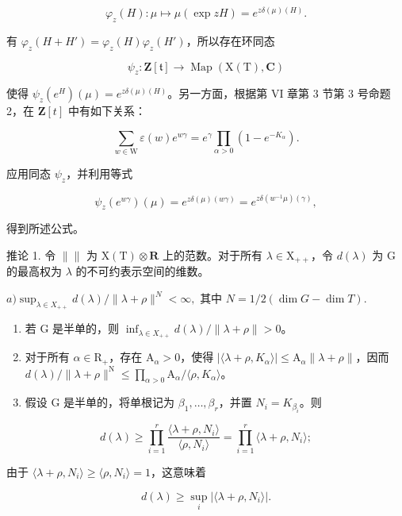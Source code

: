\[
\varphi_ {z} (H): \mu \mapsto \mu (\exp z H) = e ^ {z \delta (\mu) (H)}.
\]

有 \(\varphi_z(H + H') = \varphi_z(H)\varphi_z(H')\)，所以存在环同态

\[
\psi_ {z}: \mathbf {Z} [ \mathfrak {t} ] \to \operatorname{Map} (\mathrm{X} (\mathrm{T}), \mathbf {C})
\]

使得 \(\psi_z(e^H)(\mu) = e^{z\delta (\mu)(H)}\)。另一方面，根据第 VI 章第 3 节第 3 号命题 2，在 \(\mathbf{Z}[t]\) 中有如下关系：

\[
\sum_ {w \in \mathrm{W}} \varepsilon (w) e ^ {w \gamma} = e ^ {\gamma} \prod_ {\alpha > 0} (1 - e ^ {- K _ {\alpha}}).
\]

应用同态 \(\psi_z\)，并利用等式

\[
\psi_ {z} (e ^ {w \gamma}) (\mu) = e ^ {z \delta (\mu) (w \gamma)} = e ^ {z \delta (w ^ {- 1} \mu) (\gamma)},
\]

得到所述公式。

推论 1. 令 \(\| \|\) 为 \(\mathrm{X(T)}\otimes \mathbf{R}\) 上的范数。对于所有 \(\lambda \in \mathrm{X}_{++}\)，令 \(d(\lambda)\) 为 \(\mathrm{G}\) 的最高权为 \(\lambda\) 的不可约表示空间的维数。

\(a) \sup_{\lambda \in X_{++}} d(\lambda) / \| \lambda + \rho \|^{N} < \infty, \text{ 其中 } N = 1/2 (\dim G - \dim T).\)

\begin{enumerate}
\def\labelenumi{\alph{enumi})}
\setcounter{enumi}{1}
\item
  若 G 是半单的，则 \(\inf_{\lambda\in X_{++}}d(\lambda)/\|\lambda+\rho\|>0\)。
\item
  对于所有 \(\alpha \in \mathrm{R}_{+}\)，存在 \(\mathrm{A}_{\alpha} > 0\)，使得 \(|\langle \lambda + \rho, K_{\alpha} \rangle| \leq \mathrm{A}_{\alpha} \| \lambda + \rho \|\)，因而 \(d(\lambda) / \| \lambda + \rho \|^{\mathrm{N}} \leq \prod_{\alpha > 0} \mathrm{A}_{\alpha} / \langle \rho, K_{\alpha} \rangle\)。
\item
  假设 G 是半单的，将单根记为 \(\beta_{1},\ldots,\beta_{r}\)，并置 \(N_{i}=K_{\beta_{i}}\)。则
\end{enumerate}

\[
d (\lambda) \geq \prod_ {i = 1} ^ {r} \frac {\langle \lambda + \rho , N _ {i} \rangle}{\langle \rho , N _ {i} \rangle} = \prod_ {i = 1} ^ {r} \langle \lambda + \rho , N _ {i} \rangle ;
\]

由于 \(\langle \lambda +\rho ,N_i\rangle \geq \langle \rho ,N_i\rangle = 1\)，这意味着

\[
d (\lambda) \geq \sup _ {i} | \langle \lambda + \rho , N _ {i} \rangle |.
\]

